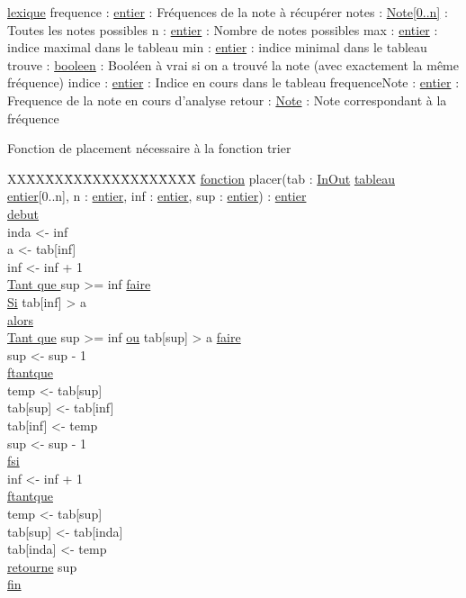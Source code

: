 \ul{lexique}\newline
frequence : \ul{entier} : Fréquences de la note à récupérer\newline
notes : \ul{Note[0..n]} : Toutes les notes possibles\newline
n :  \ul{entier} : Nombre de notes possibles\newline
max : \ul{entier} : indice maximal dans le tableau\newline
min : \ul{entier} : indice minimal dans le tableau\newline
trouve : \ul{booleen} : Booléen à vrai si on a trouvé la note (avec exactement la même fréquence)\newline
indice : \ul{entier} : Indice en cours dans le tableau\newline
frequenceNote : \ul{entier} : Frequence de la note en cours d'analyse\newline
retour : \ul{Note} : Note correspondant à la fréquence\newline

Fonction de placement nécessaire à la fonction trier\newline

\begin{tabbing}
\kill XX\=XX\=XX\=XX\=XX\=XX\=XX\=XX\=XX\=XX\=
\kill
\ul{fonction} placer(tab : \ul{InOut} \ul{tableau entier}[0..n], n : \ul{entier}, inf : \ul{entier}, sup : \ul{entier}) : \ul{entier}\\
\ul{debut}\\
    \>inda <- inf\\
    \>a <- tab[inf]\\
    \>inf <- inf + 1\\
    \>\ul{Tant que } sup >= inf \ul{faire}\\
        \>\>\ul{Si} tab[inf] > a\\
        \>\>\ul{alors}\\
            \>\>\>\ul{Tant que} sup >= inf \ul{ou} tab[sup] > a \ul{faire}\\
                \>\>\>\>sup <- sup - 1\\
            \>\>\>\ul{ftantque}\\
            \>\>\>temp <- tab[sup]\\
            \>\>\>tab[sup] <- tab[inf]\\
            \>\>\>tab[inf] <- temp\\
            \>\>\>sup <- sup - 1\\
        \>\>\ul{fsi}\\
        \>\>inf <- inf + 1\\
    \>\ul{ftantque}\\
    \>temp <- tab[sup]\\
    \>tab[sup] <- tab[inda]\\
    \>tab[inda] <- temp\\
    \>\ul{retourne} sup\\
\ul{fin}\\
\end{tabbing}

